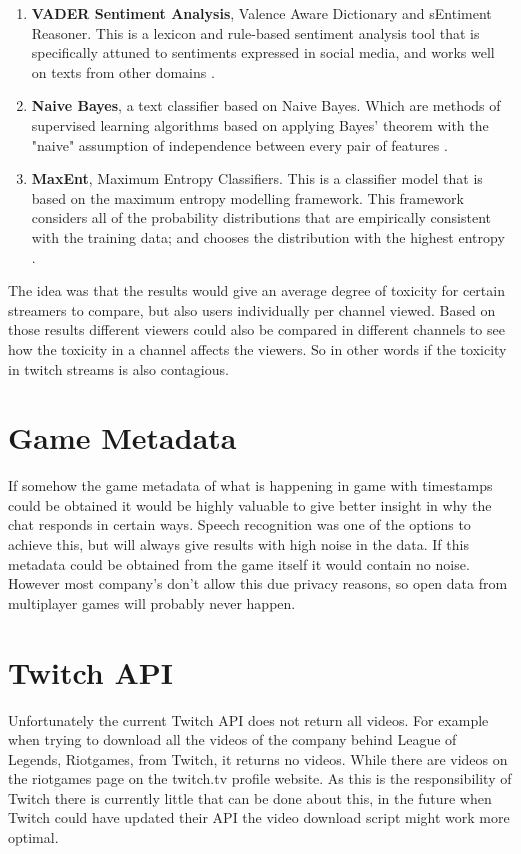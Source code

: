 \documentclass[final]{report}
\begin{document}
\begin{enumerate}
	\item \textbf{VADER Sentiment Analysis}, Valence Aware Dictionary and sEntiment Reasoner. This is a lexicon and rule-based sentiment analysis tool that is specifically attuned to sentiments expressed in social media, and works well on texts from other domains \cite{vader}.
	\item \textbf{Naive Bayes}, a text classifier based on Naive Bayes. Which are methods of supervised learning algorithms based on applying Bayes' theorem with the "naive" assumption of independence between every pair of features \cite{naivebayes}.
	\item \textbf{MaxEnt}, Maximum Entropy Classifiers. This is a classifier model that is based on the maximum entropy modelling framework. This framework considers all of the probability distributions that are empirically consistent with the training data; and chooses the distribution with the highest entropy \cite{maxent}.
\end{enumerate}

The idea was that the results would give an average degree of toxicity for certain streamers to compare, but also users individually per channel viewed. Based on those results different viewers could also be compared in different channels to see how the toxicity in a channel affects the viewers. So in other words if the toxicity in twitch streams is also contagious.

\section{Game Metadata}

If somehow the game metadata of what is happening in game with timestamps could be obtained it would be highly valuable to give better insight in why the chat responds in certain ways. Speech recognition was one of the options to achieve this, but will always give results with high noise in the data. If this metadata could be obtained from the game itself it would contain no noise. However most company's don't allow this due privacy reasons, so open data from multiplayer games will probably never happen.

\section{Twitch API}

Unfortunately the current Twitch API does not return all videos. For example when trying to download all the videos of the company behind League of Legends, Riotgames, from Twitch, it returns no videos. While there are videos on the riotgames page on the twitch.tv profile website. As this is the responsibility of Twitch there is currently little that can be done about this, in the future when Twitch could have updated their API the video download script might work more optimal.
\end{document}
